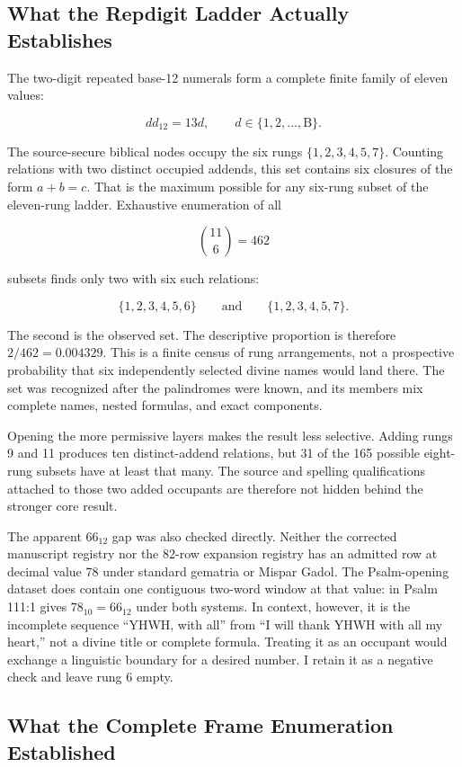 \subsection{What the Repdigit Ladder Actually Establishes}

The two-digit repeated base-12 numerals form a complete finite family of eleven values:

\[
dd_{12}=13d,
\qquad
d\in\{1,2,\ldots,\mathrm{B}\}.
\]

The source-secure biblical nodes occupy the six rungs $\{1,2,3,4,5,7\}$. Counting relations with two distinct occupied addends, this set contains six closures of the form $a+b=c$. That is the maximum possible for any six-rung subset of the eleven-rung ladder. Exhaustive enumeration of all

\[
\binom{11}{6}=462
\]

subsets finds only two with six such relations:

\[
\{1,2,3,4,5,6\}
\qquad\text{and}\qquad
\{1,2,3,4,5,7\}.
\]

The second is the observed set. The descriptive proportion is therefore $2/462=0.004329$. This is a finite census of rung arrangements, not a prospective probability that six independently selected divine names would land there. The set was recognized after the palindromes were known, and its members mix complete names, nested formulas, and exact components.

Opening the more permissive layers makes the result less selective. Adding rungs 9 and 11 produces ten distinct-addend relations, but 31 of the 165 possible eight-rung subsets have at least that many. The source and spelling qualifications attached to those two added occupants are therefore not hidden behind the stronger core result.

The apparent $66_{12}$ gap was also checked directly. Neither the corrected manuscript registry nor the 82-row expansion registry has an admitted row at decimal value 78 under standard gematria or Mispar Gadol. The Psalm-opening dataset does contain one contiguous two-word window at that value:  in Psalm 111:1 gives $78_{10}=66_{12}$ under both systems. In context, however, it is the incomplete sequence ``YHWH, with all'' from ``I will thank YHWH with all my heart,'' not a divine title or complete formula.\cite{oshb} Treating it as an occupant would exchange a linguistic boundary for a desired number. I retain it as a negative check and leave rung 6 empty.

\subsection{What the Complete Frame Enumeration Established}

